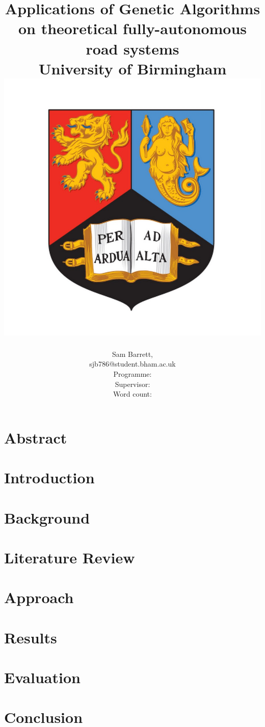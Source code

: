 \documentclass[a4paper,11pt]{report}
\title{
	{Applications of Genetic Algorithms on theoretical fully-autonomous road systems} \\
	{\large University of Birmingham} \\ 
	{\includegraphics[scale=0.3]{uobcrest.jpg}}
}
\author{Sam Barrett, \ID \\ sjb786@student.bham.ac.uk \\ Programme: \programme \\ Supervisor: \supervisor \\ Word count: }
\begin{document}
\maketitle
\listoftodos

\chapter*{Abstract}\label{chap:Abs}

\tableofcontents
\chapter{Introduction}\label{chap:Intro}

\chapter{Background}\label{chap:Background}

\chapter{Literature Review}\label{chap:LitRev}

\chapter{Approach}\label{chap:ClassicalApproach}

\chapter{Results}

\chapter{Evaluation}\label{chap:Eval}

\chapter{Conclusion}\label{chap:Conclusion}




\end{document}
